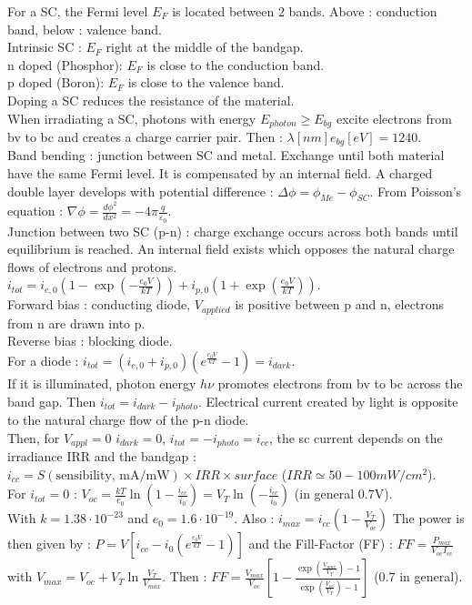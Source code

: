\documentclass[../main.tex]{subfiles}
\begin{document}
For a SC, the Fermi level $E_F$ is located between 2 bands. Above : conduction band, below : valence band.\\
Intrinsic SC : $E_F$ right at the middle of the bandgap.\\
n doped (Phosphor): $E_F$ is close to the conduction band.\\
p doped (Boron): $E_F$ is close to the valence band.\\
Doping a SC reduces the resistance of the material. \\

When irradiating a SC, photons with energy $E_{photon} \geq E_{bg}$ excite electrons from bv to bc and creates a charge carrier pair. Then : $\lambda[nm] e_{bg} [eV] = 1240$.\\

Band bending : junction between SC and metal. Exchange until both material have the same Fermi level. It is compensated by an internal field. A charged double layer develops with potential difference : $\Delta \phi = \phi_{Me}-\phi_{SC}$. From Poisson's equation : $\nabla \phi = \frac{d\phi^2}{dx^2} = -4\pi \frac{q}{\varepsilon_0}$. \\
Junction between two SC (p-n) : charge exchange occurs across both bands until equilibrium is reached. An internal field exists which opposes the natural charge flows of electrons and protons. $i_{tot} = i_{e,0} (1-\exp(-\frac{e_0V}{kT})) +i_{p,0}  (1+\exp(\frac{e_0V}{kT}))$.\\
Forward bias : conducting diode, $V_{applied}$ is positive between p and n, electrons from n are drawn into p. \\
Reverse bias : blocking diode.\\
For a diode : $i_{tot} = (i_{e,0} + i_{p,0}) (e^{\frac{e_0V}{kT}}-1) = i_{dark}$.\\
If it is illuminated, photon energy $h\nu$ promotes electrons from bv to bc across the band gap. Then $i_{tot} = i_{dark} - i_{photo}$. Electrical current created by light is opposite to the natural charge flow of the p-n diode. \\
Then, for $V_{appl} = 0$ $i_{dark} = 0$, $i_{tot} = -i_{photo} = i_{cc}$, the sc current depends on the irradiance IRR and the bandgap : $i_{cc} = S (\text{sensibility, mA/mW}) \times IRR \times surface$ ($IRR \simeq 50-100 mW/cm^2$). \\
For $i_{tot} = 0$ : $V_{oc} = \frac{kT}{e_0} \ln(1-\frac{i_{cc}}{i_0}) = V_T \ln(-\frac{i_{cc}}{i_0})$ (in general 0.7V).\\ 
With $k = 1.38\cdot 10^{-23}$ and $e_0 = 1.6\cdot 10^{-19}$. Also : $i_{max} = i_{cc} (1-\frac{V_T}{V_{oc}})$
The power is then given by : $P = V [i_{cc} - i_0(e^{\frac{e_0V}{kT}}-1)]$ and the Fill-Factor (FF) : $FF = \frac{P_{max}}{V_{oc} I_{cc}}$ with $V_{max} = V_{oc} + V_T \ln \frac{V_T}{V_{max}}$. Then : $FF = \frac{V_{max}}{V_{oc}} [1- \frac{\exp(\frac{V_{max}}{V_T})-1}{\exp(\frac{V_{oc}}{V_T})-1}]$ (0.7 in general).\\
\end{document}
